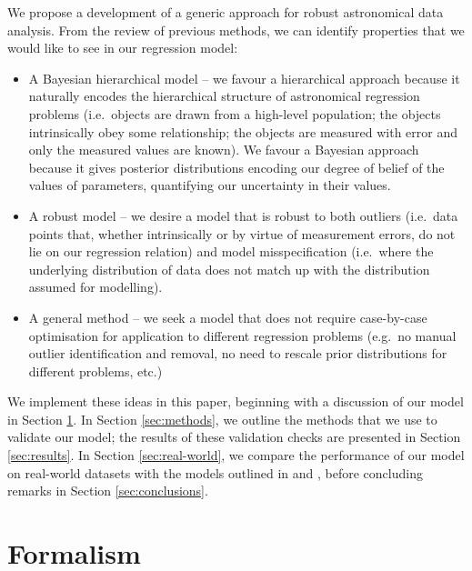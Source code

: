 \documentclass[fleqn,usenatbib]{mnras}
\begin{document}
We propose a development of a generic approach for robust astronomical data
analysis. From the review of previous methods, we can identify properties that
we would like to see in our regression model:

\begin{itemize}
	\item A Bayesian hierarchical model -- we favour a hierarchical approach
	because it naturally encodes the hierarchical structure of astronomical
	regression problems (i.e.\ objects are drawn from a high-level population;
	the objects intrinsically obey some relationship; the objects are measured
	with error and only the measured values are known). We favour a Bayesian
	approach because it gives posterior distributions encoding our degree of
	belief of the values of parameters, quantifying our uncertainty in their
	values.

	\item A robust model -- we desire a model that is robust to both outliers
	(i.e.\ data points that, whether intrinsically or by virtue of measurement
	errors, do not lie on our regression relation) and model misspecification
	(i.e.\ where the underlying distribution of data does not match up with the
	distribution assumed for modelling).

	\item A general method -- we seek a model that does not require case-by-case
	optimisation for application to different regression problems (e.g.\ no
	manual outlier identification and removal, no need to rescale prior
	distributions for different problems, etc.)
\end{itemize}

We implement these ideas in this paper, beginning with a discussion of our model
in Section \ref{sec:formalism}. In Section \ref{sec:methods}, we outline the
methods that we use to validate our model; the results of these validation
checks are presented in Section \ref{sec:results}. In Section
\ref{sec:real-world}, we compare the performance of our model on real-world
datasets with the models outlined in \citet{Kelly:2007} and \citet{Park:2017},
before concluding remarks in Section \ref{sec:conclusions}.

\section{Formalism}
\label{sec:formalism}
\end{document}
